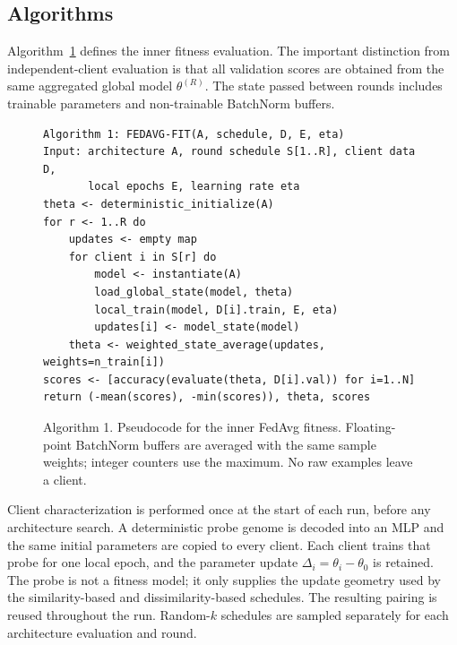 \documentclass[11pt]{article}
\begin{document}
\subsection{Algorithms}

Algorithm~\ref{alg:fitness} defines the inner fitness evaluation. The important distinction from independent-client evaluation is that all validation scores are obtained from the same aggregated global model $\theta^{(R)}$. The state passed between rounds includes trainable parameters and non-trainable BatchNorm buffers.

\begin{figure}[H]
\centering
\begin{minipage}{0.96\linewidth}
\begin{verbatim}
Algorithm 1: FEDAVG-FIT(A, schedule, D, E, eta)
Input: architecture A, round schedule S[1..R], client data D,
       local epochs E, learning rate eta
theta <- deterministic_initialize(A)
for r <- 1..R do
    updates <- empty map
    for client i in S[r] do
        model <- instantiate(A)
        load_global_state(model, theta)
        local_train(model, D[i].train, E, eta)
        updates[i] <- model_state(model)
    theta <- weighted_state_average(updates, weights=n_train[i])
scores <- [accuracy(evaluate(theta, D[i].val)) for i=1..N]
return (-mean(scores), -min(scores)), theta, scores
\end{verbatim}
\end{minipage}
\caption{Algorithm 1. Pseudocode for the inner FedAvg fitness. Floating-point BatchNorm buffers are averaged with the same sample weights; integer counters use the maximum. No raw examples leave a client.}
\label{alg:fitness}
\end{figure}

Client characterization is performed once at the start of each run, before any architecture search. A deterministic probe genome is decoded into an MLP and the same initial parameters are copied to every client. Each client trains that probe for one local epoch, and the parameter update $\Delta_i=\theta_i-\theta_0$ is retained. The probe is not a fitness model; it only supplies the update geometry used by the similarity-based and dissimilarity-based schedules. The resulting pairing is reused throughout the run. Random-$k$ schedules are sampled separately for each architecture evaluation and round.
\end{document}
